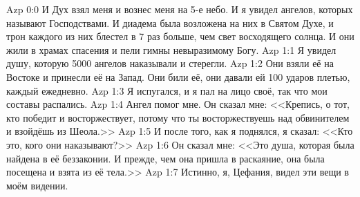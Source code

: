 \vs Azp 0:0
И Дух взял меня и вознес меня на 5-е небо.
И я увидел ангелов, которых называют Господствами.
И диадема была возложена на них в Святом Духе,
и трон каждого из них блестел в 7 раз больше,
чем свет восходящего солнца.
И они жили в храмах спасения и пели гимны невыразимому Богу.
\vs Azp 1:1
Я увидел душу, которую 5000 ангелов наказывали и стерегли.
\vs Azp 1:2
Они взяли её на Востоке и принесли её на Запад.
Они били её, они давали ей 100 ударов плетью, каждый ежедневно.
\vs Azp 1:3
Я испугался, и я пал на лицо своё,
так что мои составы распались.
\vs Azp 1:4
Ангел помог мне.
Он сказал мне:
<<Крепись, о тот, кто победит и восторжествует,
потому что ты восторжествуешь над обвинителем и взойдёшь из Шеола.>>
\vs Azp 1:5
И после того, как я поднялся, я сказал:
<<Кто это, кого они наказывают?>>
\vs Azp 1:6
Он сказал мне:
<<Это душа, которая была найдена в её беззаконии.
И прежде, чем она пришла в раскаяние,
она была посещена и взята из её тела.>>
\vs Azp 1:7
Истинно, я, Цефания, видел эти вещи в моём видении.

